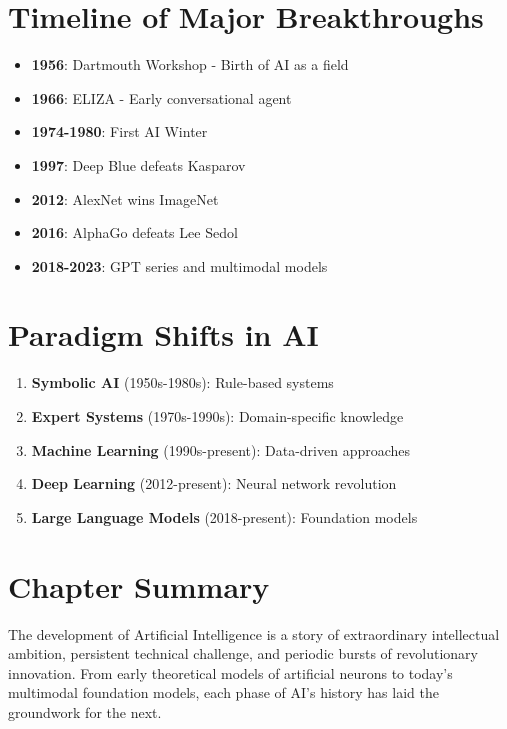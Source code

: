 \documentclass[openany]{book}
\begin{document}
\section{Timeline of Major Breakthroughs}

\begin{itemize}
    \item \textbf{1956}: Dartmouth Workshop - Birth of AI as a field
    \item \textbf{1966}: ELIZA - Early conversational agent
    \item \textbf{1974-1980}: First AI Winter
    \item \textbf{1997}: Deep Blue defeats Kasparov
    \item \textbf{2012}: AlexNet wins ImageNet
    \item \textbf{2016}: AlphaGo defeats Lee Sedol
    \item \textbf{2018-2023}: GPT series and multimodal models
\end{itemize}

\section{Paradigm Shifts in AI}

\begin{enumerate}
    \item \textbf{Symbolic AI} (1950s-1980s): Rule-based systems
    \item \textbf{Expert Systems} (1970s-1990s): Domain-specific knowledge
    \item \textbf{Machine Learning} (1990s-present): Data-driven approaches
    \item \textbf{Deep Learning} (2012-present): Neural network revolution
    \item \textbf{Large Language Models} (2018-present): Foundation models
\end{enumerate}

\section{Chapter Summary}

The development of Artificial Intelligence is a story of extraordinary 
intellectual ambition, persistent technical challenge, and periodic bursts of 
revolutionary innovation. From early theoretical models of artificial neurons to 
today's multimodal foundation models, each phase of AI's history has laid the 
groundwork for the next.
\end{document}
